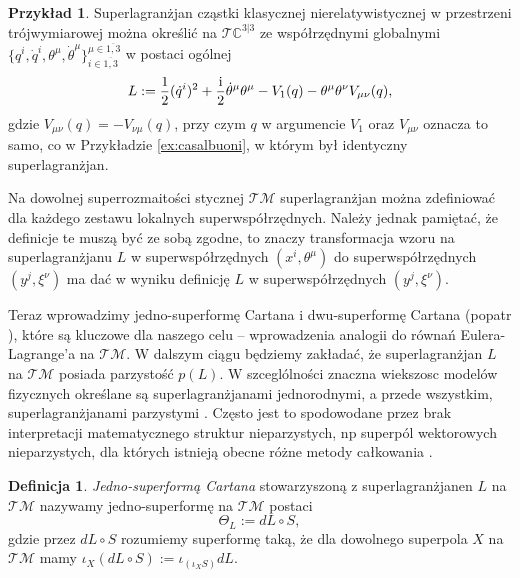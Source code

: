 \documentclass[11pt,a4paper]{report}
\theoremstyle{definition}
\newtheorem{example}[theorem]{Przykład}
\newtheorem{definition}[theorem]{Definicja}
\begin{document}
\begin{example}
 Superlagranżjan cząstki klasycznej nierelatywistycznej w przestrzeni trójwymiarowej można określić na $\mathcal{T}\mathbb{C}^{3|3}$ ze współrzędnymi globalnymi $\{ q^i, \dot q^i, \theta^\mu, \dot \theta^\mu \}^{\mu \in \overline{1,3}}_{i\in \overline{1,3}}$ w postaci ogólnej
 \begin{equation}
   	L:= \frac12  (\dot{q}^i)^2+\frac{\rm i}2\dot\theta^\mu\theta^\mu-V_1({q})-\theta^\mu \theta^\nu V_{\mu \nu}({q}),
 \end{equation}
 gdzie $V_{\mu \nu} (q) = - V_{\nu \mu} ({q})$, przy czym $q$ w argumencie $V_1$ oraz $V_{\mu \nu}$ oznacza to samo, co w Przykładzie \ref{ex:casalbuoni}, w którym był identyczny superlagranżjan.
\end{example}

Na dowolnej superrozmaitości stycznej $\mathcal{T} \mathcal{M}$ superlagranżjan można zdefiniować dla każdego zestawu lokalnych superwspółrzędnych. Należy jednak pamiętać, że definicje te muszą być ze sobą zgodne, to znaczy transformacja wzoru na superlagranżjanu $L$ w superwspółrzędnych $(x^i, \theta^\mu)$ do superwspółrzędnych $(y^j, \xi^\nu)$ ma dać w wyniku definicję $L$ w superwspółrzędnych $(y^j, \xi^\nu)$.

Teraz wprowadzimy jedno-superformę Cartana i dwu-superformę Cartana (popatr \cite{carinena,So99}), które są kluczowe dla naszego celu -- wprowadzenia analogii do równań Eulera-Lagrange'a na $\mathcal{TM}$. W dalszym ciągu będziemy zakładać, że superlagranżjan $L$ na $\mathcal{TM}$ posiada parzystość $p(L)$. W szceglólności znaczna wiekszosc modelów fizycznych określane są superlagranżjanami jednorodnymi, a przede wszystkim, superlagranżjanami parzystymi \cite{Be77,casalbuoni,Ga80}. Często jest to spodowodane przez brak interpretacji matematycznego struktur nieparzystych, np superpól wektorowych nieparzystych, dla których istnieją obecne różne metody całkowania \cite{BGM06,monterde}.


\begin{definition}
\textit{Jedno-superformą Cartana} stowarzyszoną z superlagranżjanen $L$ na $\mathcal{TM}$ nazywamy jedno-superformę na $\mathcal{TM}$ postaci
\begin{equation}\label{2Car}
\Theta_L := dL \circ S,
\end{equation}
gdzie przez $dL \circ S$ rozumiemy superformę taką, że dla dowolnego superpola $X$ na $\mathcal{TM}$ mamy $\iota_X (dL \circ S) := \iota_{(\iota_X S)} dL.$
\end{definition}
\end{document}
